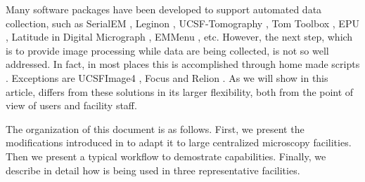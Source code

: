 Many software packages have been developed to support automated data collection, such as SerialEM \citep{Mastronarde2005}, Leginon \citep{Suloway2009}, UCSF-Tomography \citep{Zheng2007}, Tom Toolbox \citep{Nickell2005}, EPU \citep{EPU}, Latitude in Digital Micrograph \citep{Latitude}, EMMenu \citep{emmenu}, etc. However, the next step,  which is to provide image processing while  data are being collected, is not so well addressed. In fact, in most places this is accomplished through home made scripts \citep[e.g.][]{Pichkur2018}. %
Exceptions are UCSFImage4 \citep{Li2015}, Focus \citep{Biyani2017} and Relion \citep{fernandez2017:relion-pipeline}. As we will show in this article, \scipion differs from these solutions in its larger flexibility, both from the point of view of users and facility staff.

The organization of this document is as follows. First, we present the modifications introduced in \scipion to adapt it to large centralized microscopy facilities. Then we present a typical workflow to demostrate \scipion capabilities. Finally,  we describe in detail how \scipion is being used in three representative facilities.

